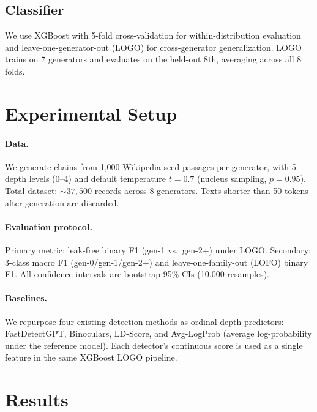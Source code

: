 \documentclass[11pt,a4paper]{article}
\begin{document}
\subsection{Classifier}

We use XGBoost with 5-fold cross-validation for within-distribution evaluation and leave-one-generator-out (LOGO) for cross-generator generalization. LOGO trains on 7 generators and evaluates on the held-out 8th, averaging across all 8 folds.

\section{Experimental Setup}

\paragraph{Data.} We generate chains from 1,000 Wikipedia seed passages per generator, with 5 depth levels (0--4) and default temperature $t = 0.7$ (nucleus sampling, $p = 0.95$). Total dataset: ${\sim}37{,}500$ records across 8 generators. Texts shorter than 50 tokens after generation are discarded.

\paragraph{Evaluation protocol.} Primary metric: leak-free binary F1 (gen-1 vs.\ gen-2+) under LOGO. Secondary: 3-class macro F1 (gen-0/gen-1/gen-2+) and leave-one-family-out (LOFO) binary F1. All confidence intervals are bootstrap 95\% CIs (10,000 resamples).

\paragraph{Baselines.} We repurpose four existing detection methods as ordinal depth predictors: FastDetectGPT, Binoculars, LD-Score, and Avg-LogProb (average log-probability under the reference model). Each detector's continuous score is used as a single feature in the same XGBoost LOGO pipeline.

\section{Results}
\end{document}
